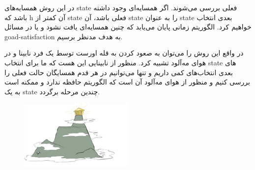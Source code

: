 در این روش همسایه‌های state فعلی بررسی می‌شوند.
اگر همسایه‌ای وجود داشته باشد که h آن کمتر از state فعلی باشد، آن state را به عنوان state بعدی انتخاب خواهیم کرد.
الگوریتم زمانی پایان می‌یابد که چنین همسایه‌ای یافت نشود و یا در مسائل goad-satisfaction به هدف مدنظر برسیم.

در واقع این روش را می‌توان به صعود کردن به قله اورست توسط یک فرد نابینا و در هوای مه‌آلود تشبیه کرد.
منظور از نابینایی این هست که ما برای انتخاب state های بعدی انتخاب‌های کمی داریم و تنها می‌توانیم در هر قدم همسایگان حالت فعلی را بررسی کنیم و منظور از هوای مه‌آلود آن است که الگوریتم حافظه‌ ندارد و ممکنه است به یک state چندین مرحله برگردد.

\begin{figure}[H]
    \centering
    \includegraphics[width=0.5\textwidth]{source/everest-climbing}
    \label{fig:hill-climbing}
\end{figure}

